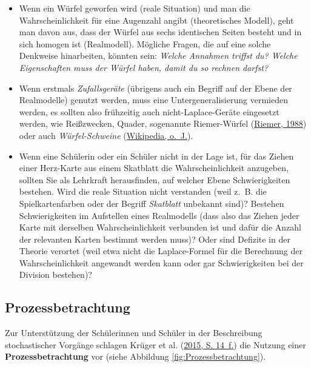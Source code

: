 \documentclass[
]{scrbook}
\theoremstyle{definition}
\theoremstyle{definition}
\theoremstyle{definition}
\theoremstyle{definition}
\theoremstyle{remark}
\begin{document}
\begin{itemize}
\item
  Wenn ein Würfel geworfen wird (reale Situation) und man die Wahrscheinlichkeit für eine Augenzahl angibt (theoretisches Modell), geht man davon aus, dass der Würfel aus sechs identischen Seiten besteht und in sich homogen ist (Realmodell). Mögliche Fragen, die auf eine solche Denkweise hinarbeiten, könnten sein: \emph{Welche Annahmen triffst du? Welche Eigenschaften muss der Würfel haben, damit du so rechnen darfst?}
\item
  Wenn erstmals \emph{Zufallsgeräte} (übrigens auch ein Begriff auf der Ebene der Realmodelle) genutzt werden, muss eine Untergeneralisierung vermieden werden, es sollten also frühzeitig auch nicht-Laplace-Geräte eingesetzt werden, wie Reißzwecken, Quader, sogenannte Riemer-Würfel (\protect\hyperlink{ref-Riemer1988}{Riemer, 1988}) oder auch \emph{Würfel-Schweine} (\protect\hyperlink{ref-dewiki:214496187}{Wikipedia, o.~J.}).
\item
  Wenn eine Schülerin oder ein Schüler nicht in der Lage ist, für das Ziehen einer Herz-Karte aus einem Skatblatt die Wahrscheinlichkeit anzugeben, sollten Sie als Lehrkraft herausfinden, auf welcher Ebene Schwierigkeiten bestehen. Wird die reale Situation nicht verstanden (weil z.~B. die Spielkartenfarben oder der Begriff \emph{Skatblatt} unbekannt sind)? Bestehen Schwierigkeiten im Aufstellen eines Realmodells (dass also das Ziehen jeder Karte mit derselben Wahrscheinlichkeit verbunden ist und dafür die Anzahl der relevanten Karten bestimmt werden muss)? Oder sind Defizite in der Theorie verortet (weil etwa nicht die Laplace-Formel für die Berechnung der Wahrscheinlichkeit angewandt werden kann oder gar Schwierigkeiten bei der Division bestehen)?
\end{itemize}

\hypertarget{prozessbetrachtung}{%
\subsection{Prozessbetrachtung}\label{prozessbetrachtung}}

Zur Unterstützung der Schülerinnen und Schüler in der Beschreibung stochastischer Vorgänge schlagen Krüger et al. (\protect\hyperlink{ref-Kruger2015}{2015, S. 14~f.}) die Nutzung einer \textbf{Prozessbetrachtung} vor (siehe Abbildung \ref{fig:Prozessbetrachtung}).
\end{document}
